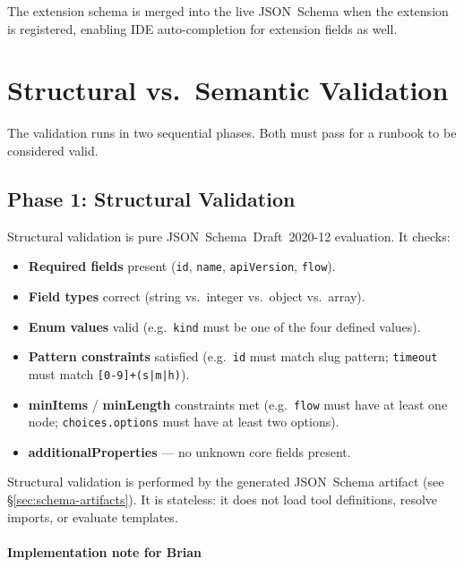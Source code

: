The extension schema is merged into the live JSON~Schema when the extension is
registered, enabling IDE auto-completion for extension fields as well.

\section{Structural vs.\ Semantic Validation}
\label{sec:validation}

The validation runs in two sequential phases.  Both must pass for a runbook to
be considered valid.

\subsection{Phase 1: Structural Validation}
\label{subsec:structural}

Structural validation is pure JSON~Schema~Draft~2020-12 evaluation.  It checks:

\begin{itemize}
  \item \textbf{Required fields} present (\texttt{id}, \texttt{name},
        \texttt{apiVersion}, \texttt{flow}).
  \item \textbf{Field types} correct (string vs.\ integer vs.\ object vs.\ array).
  \item \textbf{Enum values} valid (e.g.\ \texttt{kind} must be one of the
        four defined values).
  \item \textbf{Pattern constraints} satisfied (e.g.\ \texttt{id} must match
        slug pattern; \texttt{timeout} must match \texttt{[0-9]+(s|m|h)}).
  \item \textbf{minItems} / \textbf{minLength} constraints met
        (e.g.\ \texttt{flow} must have at least one node;
        \texttt{choices.options} must have at least two options).
  \item \textbf{additionalProperties} — no unknown core fields present.
\end{itemize}

Structural validation is performed by the generated JSON~Schema artifact
(see \S\ref{sec:schema-artifacts}).  It is stateless: it does not load tool
definitions, resolve imports, or evaluate templates.

\paragraph{Implementation note for Brian}

